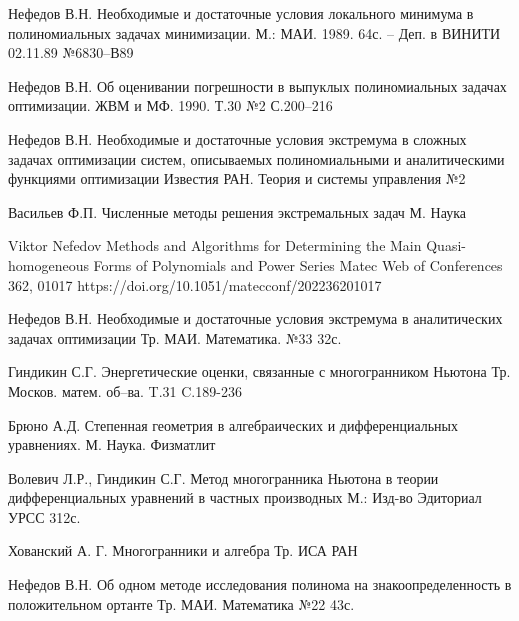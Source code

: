 \documentclass[11pt,reqno]{amsart}
\theoremstyle{plain}
\theoremstyle{definition}
\begin{document}
\begin{thebibliography}{99}  %

\by Нефедов В.Н.													  %
\paper Необходимые и достаточные условия локального минимума в полиномиальных задачах минимизации. %
\jour М.: МАИ. 1989. 64с. – Деп. в ВИНИТИ 02.11.89 №6830–В89%

\by Нефедов В.Н.
\paper Об оценивании погрешности в выпуклых полиномиальных задачах 
оптимизации.
\jour  ЖВМ и МФ. 1990. Т.30
\issue №2
\pages С.200--216


\by Нефедов В.Н.
\paper Необходимые и достаточные условия экстремума в сложных задачах оптимизации систем, описываемых полиномиальными и аналитическими функциями
оптимизации
\jour Известия РАН. Теория и системы управления
\issue №2


\by Васильев Ф.П. 
\book Численные методы решения экстремальных задач
\publaddr М.
\publ Наука


\by Viktor Nefedov
\paper Methods and Algorithms for Determining the Main Quasi-homogeneous Forms of Polynomials and Power Series
\jour Matec Web of Conferences 362, 01017
\URL https://doi.org/10.1051/matecconf/202236201017


\by Нефедов В.Н. 
\paper Необходимые и достаточные условия экстремума в аналитических задачах оптимизации
\jour Тр. МАИ. Математика. №33
\pages 32с.


\by Гиндикин С.Г. 
\paper Энергетические оценки, связанные с многогранником Ньютона
\jour Тр. Москов. матем. об–ва. T.31
\pages C.189-236

\by Брюно А.Д. 
\book Степенная геометрия в алгебраических и дифференциальных уравнениях.
\publaddr М.
\publ Наука. Физматлит

\by Волевич Л.Р.,
Гиндикин С.Г.
\paper Метод многогранника Ньютона в теории дифференциальных уравнений в частных производных
\jour М.: Изд-во Эдиториал УРСС
\pages 312с.

\by Хованский А. Г.
\book Многогранники и алгебра  
\publ Тр. ИСА РАН

\by Нефедов В.Н.
\paper Об одном методе исследования полинома на знакоопределенность в положительном ортанте
\jour  Тр. МАИ. Математика
\issue №22
\pages 43с.

\end{thebibliography}
\end{document}
